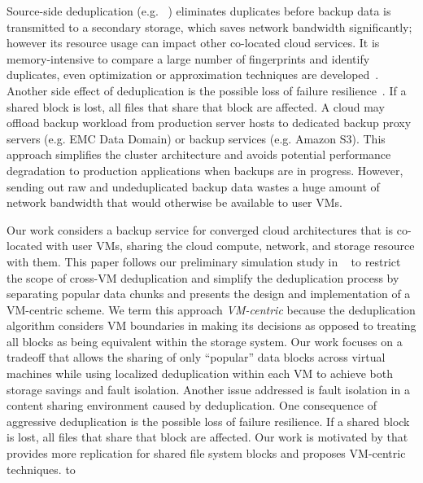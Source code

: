 Source-side deduplication (e.g. ~\cite{Symantec2009})
 eliminates duplicates before backup data is transmitted
to a secondary storage, which saves network bandwidth significantly; however its resource
usage can impact other co-located cloud services. 
It is memory-intensive to compare a large number of fingerprints and identify
duplicates, even optimization or approximation techniques are developed~\cite{Guo2011,Dong2011,extreme_binning09}. 
 Another side effect of deduplication is the possible loss of failure
resilience~\cite{Reliability06}.  
If a shared block is lost, all files that
share that block are affected.  
A cloud may offload backup workload from production 
server hosts to dedicated backup proxy servers (e.g. EMC Data Domain) or
backup services (e.g. Amazon S3). This approach simplifies the cluster 
architecture and 
avoids potential performance degradation to production applications when 
backups are in progress.
However, sending out raw and undeduplicated backup data wastes a huge amount
of network bandwidth that would otherwise be available to user VMs. 

Our work  considers a backup service for converged cloud architectures
that is co-located with user VMs, sharing the cloud compute, network, and
storage resource with them.  
This paper follows our preliminary simulation study  in ~\cite{WeiZhangIEEE} to 
restrict the scope of cross-VM deduplication and simplify the deduplication process
by separating popular data chunks and presents the design and implementation of 
a VM-centric scheme.  
We term this approach {\em VM-centric} because the deduplication
algorithm considers VM boundaries in making its decisions as opposed to
treating all blocks as being equivalent within the storage system.
Our work focuses on a tradeoff that allows the sharing of only ``popular'' data blocks 
across virtual machines while using localized deduplication within each VM
to achieve both storage savings and fault isolation.
Another issue addressed is fault  isolation in a content sharing environment caused by deduplication.
One consequence of aggressive deduplication is the possible loss of failure
resilience.  If a shared block is lost, all files that
share that block are affected.  Our work is motivated by \cite{Reliability06} that provides more
replication for shared file system blocks and proposes VM-centric techniques.
to 


